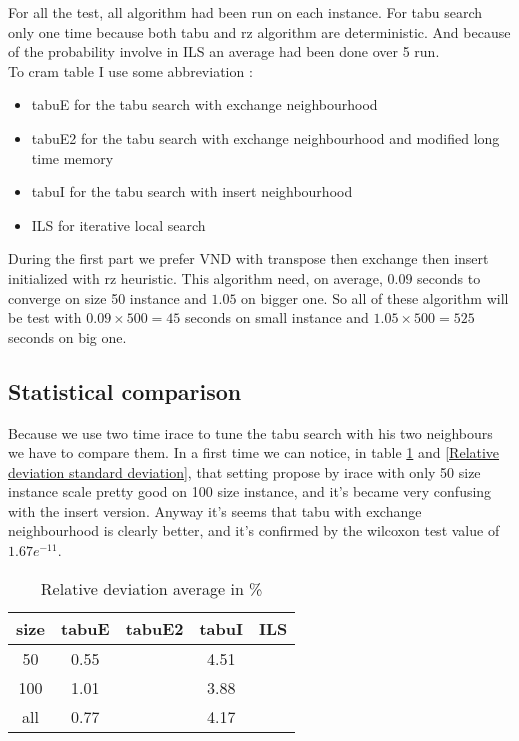 \documentclass[12pt,a4paper]{article}
\begin{document}
For all the test, all algorithm had been run on each instance. For tabu search only one time because both tabu and rz algorithm are deterministic. And because of the probability involve in ILS an average had been done over 5 run.\\
To cram table I use some abbreviation :
\begin{itemize}
\item
tabuE for the tabu search with exchange neighbourhood
\item
tabuE2 for the tabu search with exchange neighbourhood and modified long time memory
\item
tabuI for the tabu search with insert neighbourhood
\item
ILS for iterative local search
\end{itemize}
During the first part we prefer VND with transpose then exchange then insert initialized with rz heuristic. This algorithm need, on average, $0.09$ seconds to converge on size 50 instance and $1.05$ on bigger one. So all of these algorithm will be test with $0.09 \times 500 = 45$ seconds on small instance and $1.05 \times 500 = 525$ seconds on big one.

\subsection{Statistical comparison}

Because we use two time irace to tune the tabu search with his two neighbours we have to compare them. In a first time we can notice, in table \ref{Relative deviation average} and \ref{Relative deviation standard deviation}, that setting propose by irace with only 50 size instance scale pretty good on 100 size instance, and it's became very confusing with the insert version. Anyway it's seems that tabu with exchange neighbourhood is clearly better, and it's confirmed by the wilcoxon test value of $1.67 e^{-11}$.

\begin{table}[!h]
\centering
\begin{tabular}{|*{5}{c|}}
  \hline
  size & tabuE & tabuE2 & tabuI & ILS\\
  \hline
  50 & 0.55 &  & 4.51 &  \\ 
  100 & 1.01 &  & 3.88 &  \\
  all & 0.77 &  & 4.17 &  \\
  \hline
\end{tabular}
\caption{Relative deviation average in \%}
\label{Relative deviation average}
\end{table}
\end{document}
